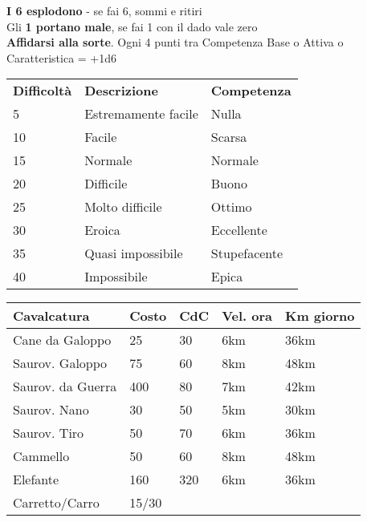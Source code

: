 \documentclass[landscape,10pt,a4paper]{article}
\begin{document}
\begin{multicols}{3}
\begin{dmbox}[title=Golden Rules]	
{\textbf{I 6 esplodono}} - se fai 6, sommi e ritiri\\
Gli \textbf{1 portano male}, se fai 1 con il dado vale zero\\
\textbf{Affidarsi alla sorte}. Ogni 4 punti tra Competenza Base o Attiva o Caratteristica = +1d6
\end{dmbox}		



\begin{dmbox}[title=Difficoltà e Competenza]	
\begin{tabular}{lll}
	\textbf{Difficoltà} & \textbf{Descrizione} & \textbf{Competenza} \\
	5 & Estremamente facile  & Nulla\\
	10  & Facile & Scarsa\\
	15  & Normale  & Normale\\
	20  & Difficile  & Buono\\
	25  & Molto difficile  & Ottimo\\
	30  & Eroica  	 & Eccellente\\
	35  & Quasi impossibile & Stupefacente\\
	40  & Impossibile  & Epica\\
\end{tabular}
\end{dmbox}		



\begin{dmbox}[title=Cavalcature/Costo/Movimento]	

\begin{tabularx}{1\textwidth}{lllXX}
\textbf{Cavalcatura} & \textbf{Costo} & \textbf{CdC} & \textbf{Vel. ora} & \textbf{Km giorno}\\
	\toprule
	Cane da Galoppo 	&25		&30	&6km & 36km \\
	Saurov. Galoppo		&75		&60	&8km & 48km \\
	Saurov. da Guerra 	&400	&80	&7km & 42km \\
	Saurov. Nano		&30		&50	&5km & 30km \\
	Saurov. Tiro		&50		&70	&6km & 36km \\
	Cammello			&50		&60	&8km & 48km \\
	Elefante			&160	&320&6km & 36km \\
	Carretto/Carro  	&15/30 	& &&
	\end{tabularx}

\bigskip


\end{dmbox}
\end{multicols}
\end{document}
